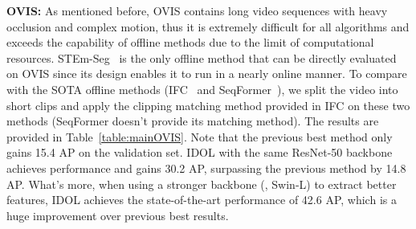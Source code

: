 \documentclass[runningheads]{llncs}
\begin{document}
\setlength{\tabcolsep}{1.4pt}

\noindent\textbf{OVIS: } As mentioned before, OVIS contains long video sequences with heavy occlusion and complex motion, thus it is extremely difficult for all algorithms and exceeds the capability of offline methods due to the limit of computational resources. STEm-Seg~\cite{STEmSEG} is the only offline method that can be directly evaluated on OVIS since its design enables it to run in a nearly online manner. To compare with the SOTA offline methods (\eg IFC~\cite{IFC} and SeqFormer~\cite{seqformer}), we split the video into short clips and apply the clipping matching method provided in IFC on these two methods (SeqFormer doesn't provide its matching method). The results are provided in Table~\ref{table:mainOVIS}. Note that the previous best method only gains 15.4 AP on the validation set. IDOL with the same ResNet-50 backbone achieves  performance and gains 30.2 AP, surpassing the previous method by 14.8 AP. What's more, when using a stronger backbone (\ie, Swin-L) to extract better features, IDOL achieves the state-of-the-art performance of 42.6 AP, which is a huge improvement over previous best results. 




\setlength{\tabcolsep}{4pt}
\begin{table}[t]
\begin{center}
\caption{Ablation study on contrastive learning and inference strategies on YTVIS.}
\label{table:trainval_ablation_ytvis}
\end{center}
\end{table}
\setlength{\tabcolsep}{1.4pt}
\end{document}
